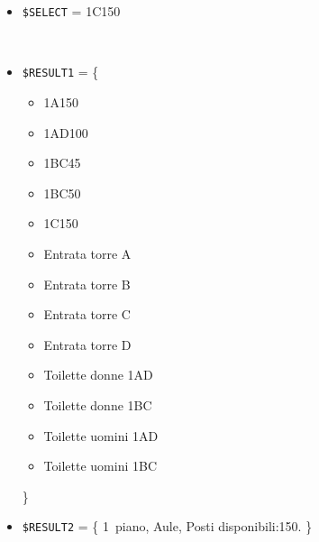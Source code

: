 \documentclass[../../SperimentazioniPratiche.tex]{subfiles}
\begin{document}
			\paragraph*{}
			\label{2Prova12A.1}
			\begin{tcolorbox}[fonttitle=\bfseries, 
								adjusted title={\Large Prova 12A.1}, 
								breakable, 
								sharp corners=south,
								colback=white, 
								colframe=white!60!black]
								
				\begin{description}[leftmargin=0.7cm,labelwidth=!]
				
					\item[Input] \ \par 
        				\begin{itemize}
        					\item \verb|$SELECT| = 1C150
        				\end{itemize}
        				
        			\tcbline 
        				
        			\item[Output atteso] \ \par
        				\begin{itemize}
        					\item \verb|$RESULT1| = \{
        					\begin{itemize}
        						\item 1A150
								\item 1AD100
								\item 1BC45
								\item 1BC50
								\item 1C150
								\item Entrata torre A
								\item Entrata torre B
								\item Entrata torre C
								\item Entrata torre D
								\item Toilette donne 1AD
								\item Toilette donne 1BC
								\item Toilette uomini 1AD
								\item Toilette uomini 1BC
        					\end{itemize}
        					\}
        					\item \verb|$RESULT2| = \{
        						1\degree\ piano, Aule, Posti disponibili:150. 
        					\}
        				\end{itemize}


\end{description}
\end{tcolorbox}
\end{document}

